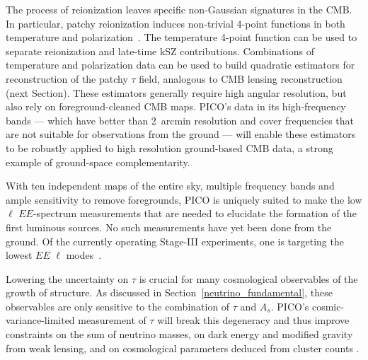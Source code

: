 \documentclass[PICOReport.tex]{subfiles}
\begin{document}


The process of reionization leaves specific non-Gaussian signatures in the CMB.  In particular, patchy reionization induces non-trivial 4-point functions in both temperature and polarization~\citep{SmithFerraro2017,DvorkinSmith2009}.  The temperature 4-point function can be used to separate reionization and late-time kSZ contributions.  Combinations of temperature and polarization data can be used to build quadratic estimators for reconstruction of the patchy $\tau$ field, analogous to CMB lensing reconstruction (next Section).  These estimators generally require high angular resolution, but also rely on foreground-cleaned CMB maps.  PICO's data in its high-frequency bands --- which have better than 2~arcmin resolution and cover frequencies that are not suitable for observations from the ground --- will enable these estimators to be robustly applied to high resolution ground-based CMB data, a strong example of ground-space complementarity.  %
%

With ten independent maps of the entire sky, multiple frequency bands and ample sensitivity to remove foregrounds, PICO is uniquely suited to make the low $\ell$ $EE$-spectrum measurements that are needed to elucidate the formation of the first luminous sources. No such measurements have yet been done from the ground. Of the currently operating Stage-III experiments, one is targeting the lowest $EE$ $\ell$ modes~\citep{class}. 

Lowering the uncertainty on $\tau$ is crucial for many cosmological observables of the growth of structure. As discussed in Section~\ref{neutrino_fundamental}, these observables are only sensitive to the combination of $\tau$ and $A_{s}$. PICO's cosmic-variance-limited measurement of $\tau$ will break this degeneracy and thus improve constraints on the sum of neutrino masses, on dark energy and modified gravity from weak lensing, and on cosmological parameters deduced from cluster counts .  
\end{document}
